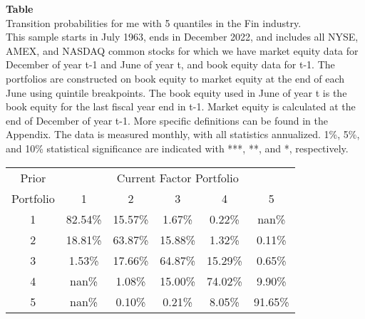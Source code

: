 \begin{table*}[ht!]
\raggedright
{}
\label{tab: transition_probs_me_Fin_with_5_quantiles}
\textbf{Table \thetable} \\
Transition probabilities for me with 5 quantiles in the Fin industry. \\
\hspace*{1em}This sample starts in July 1963, ends in December 2022, and includes all NYSE, AMEX, and NASDAQ common stocks for which we have market equity data for December of year t-1 and June of year t, and book equity data for t-1. The portfolios are constructed on book equity to market equity at the end of each June using quintile breakpoints.  The book equity used in June of year t is the book equity for the last fiscal year end in t-1.  Market equity is calculated at the end of December of year t-1.  More specific definitions can be found in the Appendix.  The data is measured monthly, with all statistics annualized.  1\%, 5\%, and 10\% statistical significance are indicated with ***, **, and *, respectively. \\
\vspace{0.5em}
\centering
\begin{adjustbox}{max width=\textwidth}
\begin{tabular}{@{}cccccc@{}}
\toprule
Prior & \multicolumn{5}{c}{Current Factor Portfolio} \\
Portfolio & 1 & 2 & 3 & 4 & 5 \\
\midrule
1 & 82.54\% & 15.57\% & 1.67\% & 0.22\% & nan\% \\
2 & 18.81\% & 63.87\% & 15.88\% & 1.32\% & 0.11\% \\
3 & 1.53\% & 17.66\% & 64.87\% & 15.29\% & 0.65\% \\
4 & nan\% & 1.08\% & 15.00\% & 74.02\% & 9.90\% \\
5 & nan\% & 0.10\% & 0.21\% & 8.05\% & 91.65\% \\
\bottomrule
\end{tabular}
\end{adjustbox}
\end{table*}